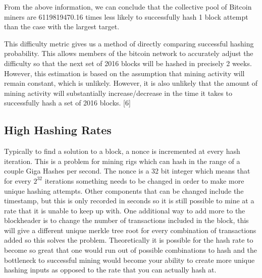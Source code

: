 \documentclass[pdftex,11pt]{article}
\begin{document}
From the above information, we can conclude that the collective pool of Bitcoin miners are 6119819470.16 times less likely to successfully hash 1 block attempt than the case with the largest target. 

This difficulty metric gives us a method of directly comparing successful hashing probability. This allows members of the bitcoin network to accurately adjust the difficulty so that the next set of 2016 blocks will be hashed in precisely 2 weeks. However, this estimation is based on the assumption that mining activity will remain constant, which is unlikely. However, it is also unlikely that the amount of mining activity will substantially increase/decrease in the time it takes to successfully hash a set of 2016 blocks. [6]

\subsection{High Hashing Rates}
Typically to find a solution to a block, a nonce is incremented at every hash iteration. This is a problem for mining rigs which can hash in the range of a couple Giga Hashes per second. The nonce is a 32 bit integer which means that for every $2^{32}$ iterations something needs to be changed in order to make more unique hashing attempts. Other components that can be changed include the timestamp, but this is only recorded in seconds so it is still possible to mine at a rate that it is unable to keep up with. One additional way to add more to the blockheader is to change the number of transactions included in the block, this will give a different unique merkle tree root for every combination of transactions added so this solves the problem. Theoretically it is possible for the hash rate to become so great that one would run out of possible combinations to hash and the bottleneck to successful mining would become your ability to create more unique hashing inputs as opposed to the rate that you can actually hash at.
\end{document}
